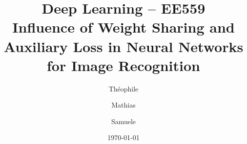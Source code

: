\documentclass[a4paper, 12pt, conference]{article}
\begin{document}
\title{\large{\textbf{Deep Learning -- EE559 \\ Influence of Weight Sharing and Auxiliary Loss in Neural Networks for Image Recognition}}}
\date{\normalsize{\today}}
\author{\normalsize{Th\' eophile 	} \and \normalsize{Mathias } \and \normalsize{Samuele }}
\maketitle


\end{document}
